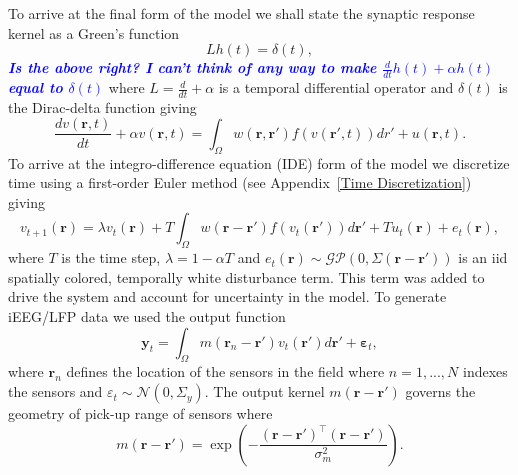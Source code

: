 \documentclass[onecolumn,draftcls]{IEEEtran}
\newcommand{\todo}[1]{\textsf{\emph{\textbf{\textcolor{blue}{#1}}}}}
\begin{document}
To arrive at the final form of the model we shall state the synaptic response kernel as a Green's function
\begin{equation}\label{GreensFuncDef}
	Lh\left( t \right) = \delta \left( t \right),
\end{equation}
\todo{Is the above right? I can't think of any way to make $\frac{d}{dt} h(t) + \alpha h(t)$ equal to $\delta(t)$}
where $L=\frac{d}{dt} + \alpha$ is a temporal differential operator and $\delta(t)$ is the Dirac-delta function giving 
\begin{equation}\label{FinalFormContinuous}
	\frac{dv\left( \mathbf{r},t \right)}{dt} + \alpha v\left( \mathbf{r},t \right) = \int_\Omega  {w\left( \mathbf{r},\mathbf{r}' \right)f\left( {v\left( \mathbf{r}',t \right)} \right)dr'} + u\left(\mathbf{r},t\right).
\end{equation}
To arrive at the integro-difference equation (IDE) form of the model we discretize time using a first-order Euler method (see Appendix~\ref{Time Discretization}) giving
\begin{equation}\label{DiscreteTimeModel}
	v_{t+1}\left(\mathbf{r}\right) = \lambda v_t\left(\mathbf{r}\right) + T \int_\Omega { w\left(\mathbf{r}-\mathbf{r}'\right) f\left(v_t\left(\mathbf{r}'\right)\right) d\mathbf{r}'} + T u_t\left(\mathbf{r}\right) + e_t\left(\mathbf{r}\right),
\end{equation} 
where $T$ is the time step, $\lambda = 1-\alpha T$ and $e_t(\mathbf{r}) \sim \mathcal{GP}\left(0,\Sigma\left(\mathbf{r}-\mathbf{r}'\right)\right)$ 
is an iid spatially colored, temporally white disturbance term. This term was added to drive the system and account for uncertainty in the model. To generate iEEG/LFP data we used the output function 
\begin{equation}
	\mathbf{y}_t = \int_{\Omega}{m\left(\mathbf{r}_n-\mathbf{r}'\right)v_t\left(\mathbf{r}'\right)d\mathbf{r}'} + \boldsymbol{\varepsilon}_t,
\end{equation}
where $\mathbf{r}_n$ defines the location of the sensors in the field where $n=1,...,N$ indexes the sensors and $\varepsilon_t \sim \mathcal{N}\left(0,\Sigma_y\right)$. The output kernel $m(\mathbf{r}-\mathbf{r}')$ governs the geometry of pick-up range of sensors where
\begin{equation}
	m\left(\mathbf{r}-\mathbf{r}'\right) = \exp{\left(-\frac{(\mathbf{r}-\mathbf{r}')^\top(\mathbf{r}-\mathbf{r}')}{\sigma_m^2}\right)}.
\end{equation}
\end{document}
